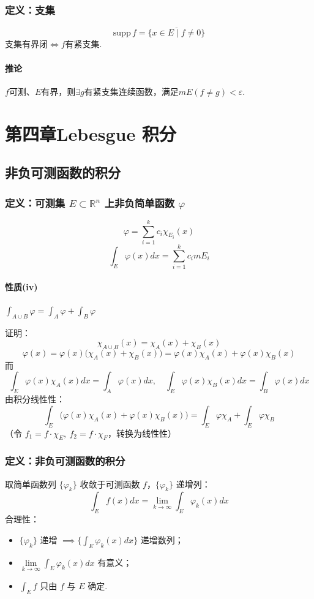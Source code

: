 \documentclass{article}
\begin{document}
	\subsubsection{定义：支集}
	\[
	\mathrm{supp}\,f=\overline{\{x\in E\mid f\ne0\}}
	\]
	支集有界闭$\iff f$有紧支集.
	
	\paragraph{推论}
	$f$可测、$E$有界，则$\exists g$有紧支集连续函数，满足$mE(f\ne g)<\varepsilon$.
	
	\section{第四章\quad Lebesgue 积分}
	\subsection{非负可测函数的积分}
	\subsubsection{定义：可测集 $E\subset\mathbb{R}^n$ 上非负简单函数 $\varphi$}
	\[
	\displaystyle \varphi = \sum_{i=1}^k c_i \chi_{E_i}(x)
	\]
	\[
	\displaystyle \int_E \varphi(x)dx = \sum_{i=1}^k c_i mE_i
	\]
	
	\paragraph{性质(iv)} $\displaystyle \int_{A\cup B}\varphi = \int_A \varphi + \int_B \varphi$
	
	证明：
	\[
	\chi_{A\cup B}(x) = \chi_A(x) + \chi_B(x)
	\]
	\[
	\varphi(x) = \varphi(x)\big(\chi_A(x)+\chi_B(x)\big) = \varphi(x)\chi_A(x) + \varphi(x)\chi_B(x)
	\]
	而
	\[
	\int_E \varphi(x)\chi_A(x)dx = \int_A \varphi(x)dx,\quad
	\int_E \varphi(x)\chi_B(x)dx = \int_B \varphi(x)dx
	\]
	由积分线性性：
	\[
	\displaystyle \int_E \big(\varphi(x)\chi_A(x)+\varphi(x)\chi_B(x)\big)
	= \int_E \varphi\chi_A + \int_E \varphi\chi_B
	\]
	（令 $f_1 = f\cdot\chi_E,\ f_2 = f\cdot\chi_F$，转换为线性性）
	
	\subsubsection{定义：非负可测函数的积分}
	取简单函数列 $\{\varphi_k\}$ 收敛于可测函数 $f$，$\{\varphi_k\}$ 递增列：
	\[
	\displaystyle \int_E f(x)dx = \lim_{k\to\infty}\int_E \varphi_k(x)dx
	\]
	合理性：
	\begin{itemize}
		\item $\{\varphi_k\}$ 递增 $\implies \big\{\int_E \varphi_k(x)dx\big\}$ 递增数列；
		\item $\lim\limits_{k\to\infty}\int_E \varphi_k(x)dx$ 有意义；
		\item $\int_E f$ 只由 $f$ 与 $E$ 确定.
	\end{itemize}
	
\end{document}
